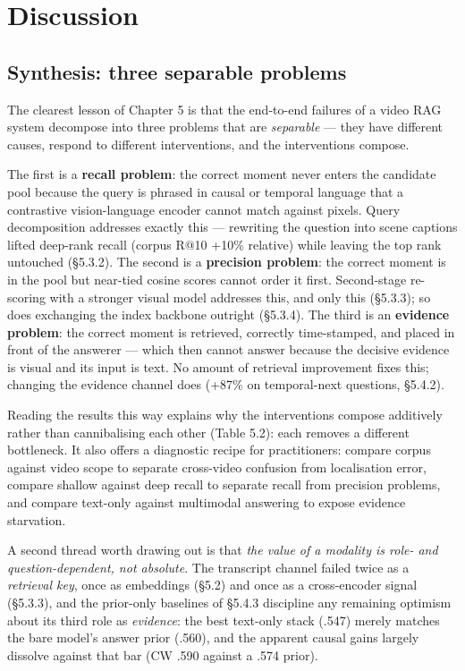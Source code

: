 \chapter{Discussion}

\section{Synthesis: three separable
problems}

The clearest lesson of Chapter 5 is that the end-to-end failures of a
video RAG system decompose into three problems that are \emph{separable}
--- they have different causes, respond to different interventions, and
the interventions compose.

The first is a \textbf{recall problem}: the correct moment never enters
the candidate pool because the query is phrased in causal or temporal
language that a contrastive vision-language encoder cannot match against
pixels. Query decomposition addresses exactly this --- rewriting the
question into scene captions lifted deep-rank recall (corpus R@10 +10\%
relative) while leaving the top rank untouched (§5.3.2). The second is a
\textbf{precision problem}: the correct moment is in the pool but
near-tied cosine scores cannot order it first. Second-stage re-scoring
with a stronger visual model addresses this, and only this (§5.3.3); so
does exchanging the index backbone outright (§5.3.4). The third is an
\textbf{evidence problem}: the correct moment is retrieved, correctly
time-stamped, and placed in front of the answerer --- which then cannot
answer because the decisive evidence is visual and its input is text. No
amount of retrieval improvement fixes this; changing the evidence
channel does (+87\% on temporal-next questions, §5.4.2).

Reading the results this way explains why the interventions compose
additively rather than cannibalising each other (Table 5.2): each
removes a different bottleneck. It also offers a diagnostic recipe for
practitioners: compare corpus against video scope to separate
cross-video confusion from localisation error, compare shallow against
deep recall to separate recall from precision problems, and compare
text-only against multimodal answering to expose evidence starvation.

A second thread worth drawing out is that \emph{the value of a modality
is role- and question-dependent, not absolute}. The transcript channel
failed twice as a \emph{retrieval key}, once as embeddings (§5.2) and
once as a cross-encoder signal (§5.3.3), and the prior-only baselines of
§5.4.3 discipline any remaining optimism about its third role as
\emph{evidence}: the best text-only stack (.547) merely matches the bare
model's answer prior (.560), and the apparent causal gains largely
dissolve against that bar (CW .590 against a .574 prior).

